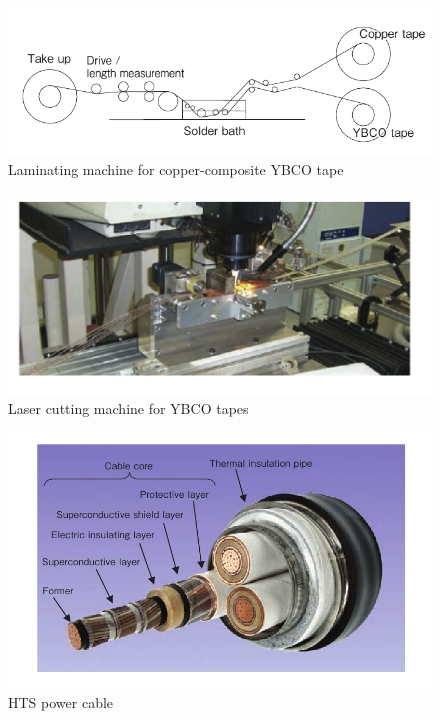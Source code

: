 \documentclass{beamer}
\begin{document}
		\begin{frame}
			\begin{figure}
				\includegraphics[width=0.9\linewidth]{laminating}
			\caption[Laminating machine for copper-composite YBCO tape]{Laminating machine for copper-composite YBCO tape}
			\end{figure}
		\end{frame}

		\begin{frame}
			\begin{figure}
				\includegraphics[width=0.9\linewidth]{lasercutting}
				\caption[Laser cutting machine for YBCO tapes]{Laser cutting machine for YBCO tapes}
			\end{figure}
		\end{frame}

		\begin{frame}
			\begin{figure}
				\includegraphics[width=0.9\linewidth]{3phase}
				\caption[HTS power cable]{HTS power cable}
			\end{figure}
		\end{frame}
\end{document}

